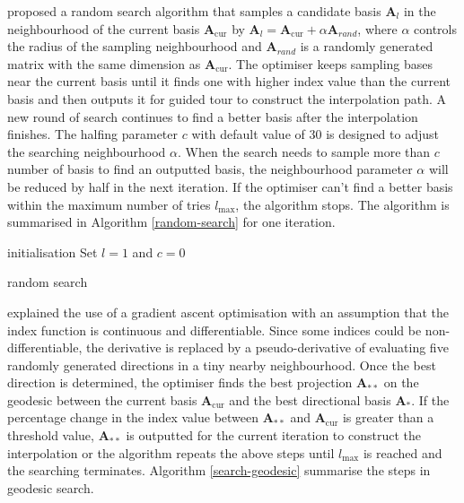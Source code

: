 \documentclass[12pt]{article}
\begin{document}
\citet{posse1995projection} proposed a random search algorithm that
samples a candidate basis \(\mathbf{A}_{l}\) in the neighbourhood of the
current basis \(\mathbf{A}_{\text{cur}}\) by
\(\mathbf{A}_{l} = \mathbf{A}_{\text{cur}} + \alpha \mathbf{A}_{rand}\),
where \(\alpha\) controls the radius of the sampling neighbourhood and
\(\mathbf{A}_{rand}\) is a randomly generated matrix with the same
dimension as \(\mathbf{A}_{\text{cur}}\). The optimiser keeps sampling
bases near the current basis until it finds one with higher index value
than the current basis and then outputs it for guided tour to construct
the interpolation path. A new round of search continues to find a better
basis after the interpolation finishes. The halfing parameter \(c\) with
default value of 30 is designed to adjust the searching neighbourhood
\(\alpha\). When the search needs to sample more than \(c\) number of
basis to find an outputted basis, the neighbourhood parameter \(\alpha\)
will be reduced by half in the next iteration. If the optimiser can't
find a better basis within the maximum number of tries \(l_{\max}\), the
algorithm stops. The algorithm is summarised in Algorithm
\ref{random-search} for one iteration.

\begin{algorithm}
\SetAlgoLined
  initialisation\;
  Set $l = 1$ and $c = 0$\;
  \caption{random search}
  \label{random-search}
\end{algorithm}

\citet{cook1995grand} explained the use of a gradient ascent
optimisation with an assumption that the index function is continuous
and differentiable. Since some indices could be non-differentiable, the
derivative is replaced by a pseudo-derivative of evaluating five
randomly generated directions in a tiny nearby neighbourhood. Once the
best direction is determined, the optimiser finds the best projection
\(\mathbf{A}_{**}\) on the geodesic between the current basis
\(\mathbf{A}_{\text{cur}}\) and the best directional basis
\(\mathbf{A}_{*}\). If the percentage change in the index value between
\(\mathbf{A}_{**}\) and \(\mathbf{A}_{\text{cur}}\) is greater than a
threshold value, \(\mathbf{A}_{**}\) is outputted for the current
iteration to construct the interpolation or the algorithm repeats the
above steps until \(l_{\max}\) is reached and the searching terminates.
Algorithm \ref{search-geodesic} summarise the steps in geodesic search.
\end{document}
